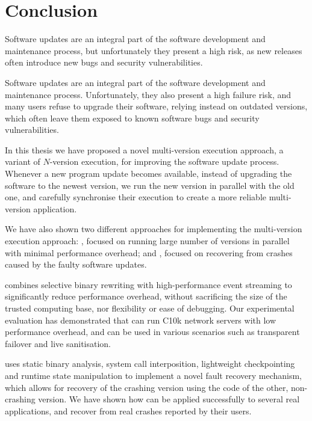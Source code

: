 \chapter{Conclusion}
\label{chap:conclusion}

Software updates are an integral part of the software development and
maintenance process, but unfortunately they present a high risk, as new
releases often introduce new bugs and security vulnerabilities.

Software updates are an integral part of the software development and
maintenance process. Unfortunately, they also present a high failure risk, and
many users refuse to upgrade their software, relying instead on outdated
versions, which often leave them exposed to known software bugs and security
vulnerabilities.

In this thesis we have proposed a novel multi-version execution approach, a
variant of $N$-version execution, for improving the software update process.
Whenever a new program update becomes available, instead of upgrading the
software to the newest version, we run the new version in parallel with the old
one, and carefully synchronise their execution to create a more reliable
multi-version application.

We have also shown two different approaches for implementing the multi-version
execution approach: \varan, focused on running large number of versions in
parallel with minimal performance overhead; and \mx, focused on recovering from
crashes caused by the faulty software updates.

\varan combines selective binary rewriting with high-performance event
streaming to significantly reduce performance overhead, without sacrificing the
size of the trusted computing base, nor flexibility or ease of debugging.  Our
experimental evaluation has demonstrated that \varan can run C10k network
servers with low performance overhead, and can be used in various scenarios
such as transparent failover and live sanitisation.

\mx uses static binary analysis, system call interposition, lightweight
checkpointing and runtime state manipulation to implement a novel fault recovery
mechanism, which allows for recovery of the crashing version using the code
of the other, non-crashing version. We have shown how \mx can be applied
successfully to several real applications, and recover from real crashes
reported by their users.
